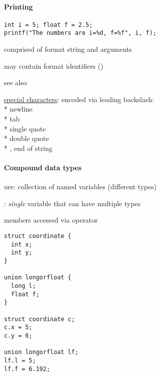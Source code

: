 \paragraph{Printing}
\begin{lstlisting}[style=customc]
int i = 5; float f = 2.5;
printf("The numbers are i=%d, f=%f", i, f);
\end{lstlisting}
\begin{items}
  \item comprised of format string and arguments
  \item may contain format identifiers ()
  \item see also 
  \item \underline{special characters}: encoded via leading backslash: \\*
    \code{\\n} newline \\*
    \code{\\t} tab \\*
     single quote \\*
     double quote \\*
     , end of string
\end{items}

\paragraph{Compound data types}
\begin{items}
  \item {}ure: collection of named variables (different types)
  \item {}: \emph{single} variable that can have multiple types
  \item members accessed via  operator
\end{items}
\begin{lstlisting}[style=customc]
struct coordinate {
  int x;
  int y;
}

union longorfloat {
  long l;
  float f;
}

struct coordinate c;
c.x = 5;
c.y = 6;

union longorfloat lf;
lf.l = 5;
lf.f = 6.192;
\end{lstlisting}

